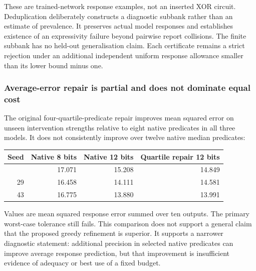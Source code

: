 \documentclass[
  british,
  11pt,
  a4paper,
]{article}
\newcounter{none} %
\begin{document}
These are trained-network response examples, not an inserted XOR
circuit. Deduplication deliberately constructs a diagnostic subbank
rather than an estimate of prevalence. It preserves actual model
responses and establishes existence of an expressivity failure beyond
pairwise report collisions. The finite subbank has no held-out
generalisation claim. Each certificate remains a strict rejection under
an additional independent uniform response allowance smaller than its
lower bound minus one.

\subsubsection{Average-error repair is partial and does not dominate
equal
cost}\label{average-error-repair-is-partial-and-does-not-dominate-equal-cost}

The original four-quartile-predicate repair improves mean squared error
on unseen intervention strengths relative to eight native predicates in
all three models. It does not consistently improve over twelve native
median predicates:

{\def\LTcaptype{none} %
\begin{longtable}[]{@{}rrrr@{}}
\toprule\noalign{}
Seed & Native 8 bits & Native 12 bits & Quartile repair 12 bits \\
\midrule\noalign{}
\endhead
\bottomrule\noalign{}
\endlastfoot
17 & 17.071 & 15.208 & 14.849 \\
29 & 16.458 & 14.111 & 14.581 \\
43 & 16.775 & 13.880 & 13.991 \\
\end{longtable}
}

Values are mean squared response error summed over ten outputs. The
primary worst-case tolerance still fails. This comparison does not
support a general claim that the proposed greedy refinement is superior.
It supports a narrower diagnostic statement: additional precision in
selected native predicates can improve average response prediction, but
that improvement is insufficient evidence of adequacy or best use of a
fixed budget.
\end{document}
